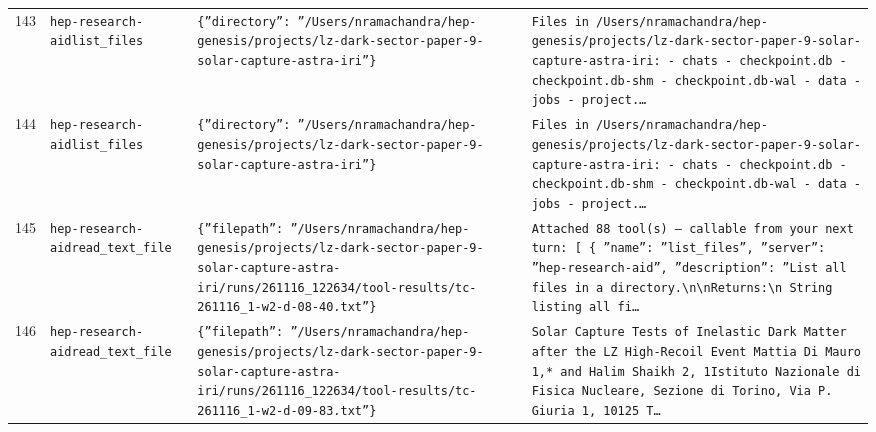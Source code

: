 \documentclass[11pt,a4paper]{article}
\begin{document}
\begin{longtable}{@{}p{}p{}p{}p{}@{}}
143 & \texttt{hep-research-aid}\newline\texttt{list\_\allowbreak{}files} & \texttt{\{''directory'':\allowbreak{} ''/\allowbreak{}Users/\allowbreak{}nramachandra/\allowbreak{}hep-genesis/\allowbreak{}projects/\allowbreak{}lz-dark-sector-paper-9-solar-capture-astra-iri''\}\allowbreak{}} & \texttt{Files in /\allowbreak{}Users/\allowbreak{}nramachandra/\allowbreak{}hep-genesis/\allowbreak{}projects/\allowbreak{}lz-dark-sector-paper-9-solar-capture-astra-iri:\allowbreak{}   - chats   - checkpoint.db   - checkpoint.db-shm   - checkpoint.db-wal   - data   - jobs   - project.\ldots{}\allowbreak{}} \\
144 & \texttt{hep-research-aid}\newline\texttt{list\_\allowbreak{}files} & \texttt{\{''directory'':\allowbreak{} ''/\allowbreak{}Users/\allowbreak{}nramachandra/\allowbreak{}hep-genesis/\allowbreak{}projects/\allowbreak{}lz-dark-sector-paper-9-solar-capture-astra-iri''\}\allowbreak{}} & \texttt{Files in /\allowbreak{}Users/\allowbreak{}nramachandra/\allowbreak{}hep-genesis/\allowbreak{}projects/\allowbreak{}lz-dark-sector-paper-9-solar-capture-astra-iri:\allowbreak{}   - chats   - checkpoint.db   - checkpoint.db-shm   - checkpoint.db-wal   - data   - jobs   - project.\ldots{}\allowbreak{}} \\
145 & \texttt{hep-research-aid}\newline\texttt{read\_\allowbreak{}text\_\allowbreak{}file} & \texttt{\{''filepath'':\allowbreak{} ''/\allowbreak{}Users/\allowbreak{}nramachandra/\allowbreak{}hep-genesis/\allowbreak{}projects/\allowbreak{}lz-dark-sector-paper-9-solar-capture-astra-iri/\allowbreak{}runs/\allowbreak{}261116\_\allowbreak{}122634/\allowbreak{}tool-results/\allowbreak{}tc-261116\_\allowbreak{}1-w2-d-08-40.txt''\}\allowbreak{}} & \texttt{Attached 88 tool(s)\allowbreak{} --- callable from your next turn:\allowbreak{} [  \{   ''name'':\allowbreak{} ''list\_\allowbreak{}files'',\allowbreak{}   ''server'':\allowbreak{} ''hep-research-aid'',\allowbreak{}   ''description'':\allowbreak{} ''List all files in a directory.\textbackslash{}\allowbreak{}n\textbackslash{}\allowbreak{}nReturns:\allowbreak{}\textbackslash{}\allowbreak{}n    String listing all fi\ldots{}\allowbreak{}} \\
146 & \texttt{hep-research-aid}\newline\texttt{read\_\allowbreak{}text\_\allowbreak{}file} & \texttt{\{''filepath'':\allowbreak{} ''/\allowbreak{}Users/\allowbreak{}nramachandra/\allowbreak{}hep-genesis/\allowbreak{}projects/\allowbreak{}lz-dark-sector-paper-9-solar-capture-astra-iri/\allowbreak{}runs/\allowbreak{}261116\_\allowbreak{}122634/\allowbreak{}tool-results/\allowbreak{}tc-261116\_\allowbreak{}1-w2-d-09-83.txt''\}\allowbreak{}} & \texttt{Solar Capture Tests of Inelastic Dark Matter after the LZ High-Recoil Event Mattia Di Mauro 1,\allowbreak{}* and Halim Shaikh 2,\allowbreak{}\dag{}\allowbreak{} 1Istituto Nazionale di Fisica Nucleare,\allowbreak{} Sezione di Torino,\allowbreak{} Via P. Giuria 1,\allowbreak{} 10125 T\ldots{}\allowbreak{}} \\

\end{longtable}
\end{document}
